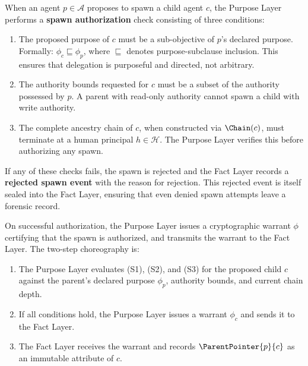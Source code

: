 \begin{definition}
\label{def:spawn_authorization}
When an agent $p \in \mathcal{A}$ proposes to spawn a child agent $c$, the Purpose Layer performs a \textbf{spawn authorization} check consisting of three conditions:

\begin{enumerate}
    \item[(S1) \textbf{Purpose Consistency:}] The proposed purpose of $c$ must be a sub-objective of $p$'s declared purpose. Formally: $\phi_c \sqsubseteq \phi_p$, where $\sqsubseteq$ denotes purpose-subclause inclusion. This ensures that delegation is purposeful and directed, not arbitrary.

    \item[(S2) \textbf{Authority Monotonicity:}] The authority bounds requested for $c$ must be a subset of the authority possessed by $p$. A parent with read-only authority cannot spawn a child with write authority.

    \item[(S3) \textbf{Human Ground:}] The complete ancestry chain of $c$, when constructed via $\Chain(c)$, must terminate at a human principal $h \in \mathcal{H}$. The Purpose Layer verifies this before authorizing any spawn.
\end{enumerate}
\end{definition}

If any of these checks fails, the spawn is rejected and the Fact Layer records a \textbf{rejected spawn event} with the reason for rejection. This rejected event is itself sealed into the Fact Layer, ensuring that even denied spawn attempts leave a forensic record.

On successful authorization, the Purpose Layer issues a cryptographic warrant $\phi$ certifying that the spawn is authorized, and transmits the warrant to the Fact Layer. The two-step choreography is:

\begin{enumerate}
    \item The Purpose Layer evaluates (S1), (S2), and (S3) for the proposed child $c$ against the parent's declared purpose $\phi_p$, authority bounds, and current chain depth.
    \item If all conditions hold, the Purpose Layer issues a warrant $\phi_c$ and sends it to the Fact Layer.
    \item The Fact Layer receives the warrant and records $\ParentPointer{p}{c}$ as an immutable attribute of $c$.
\end{enumerate}


